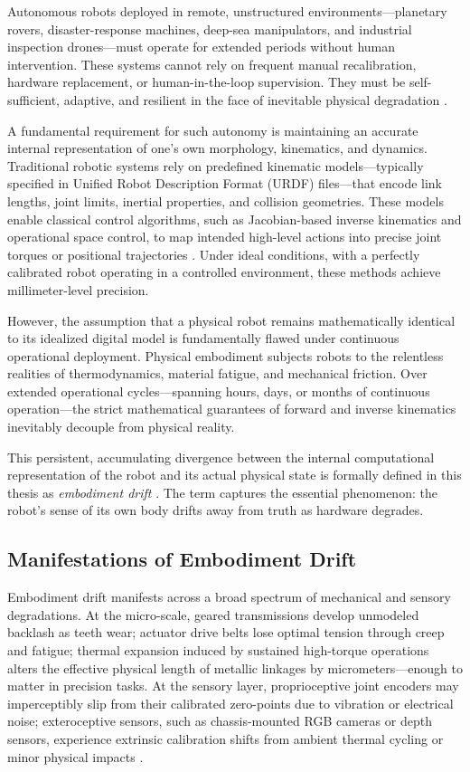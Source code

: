 \documentclass[12pt,a4paper,oneside]{report}
\begin{document}
Autonomous robots deployed in remote, unstructured environments---planetary rovers, disaster-response machines, deep-sea manipulators, and industrial inspection drones---must operate for extended periods without human intervention. These systems cannot rely on frequent manual recalibration, hardware replacement, or human-in-the-loop supervision. They must be self-sufficient, adaptive, and resilient in the face of inevitable physical degradation \cite{bongard2006resilient, cully2015robots}.

A fundamental requirement for such autonomy is maintaining an accurate internal representation of one's own morphology, kinematics, and dynamics. Traditional robotic systems rely on predefined kinematic models---typically specified in Unified Robot Description Format (URDF) files---that encode link lengths, joint limits, inertial properties, and collision geometries. These models enable classical control algorithms, such as Jacobian-based inverse kinematics and operational space control, to map intended high-level actions into precise joint torques or positional trajectories \cite{siciliano2009robotics}. Under ideal conditions, with a perfectly calibrated robot operating in a controlled environment, these methods achieve millimeter-level precision.

However, the assumption that a physical robot remains mathematically identical to its idealized digital model is fundamentally flawed under continuous operational deployment. Physical embodiment subjects robots to the relentless realities of thermodynamics, material fatigue, and mechanical friction. Over extended operational cycles---spanning hours, days, or months of continuous operation---the strict mathematical guarantees of forward and inverse kinematics inevitably decouple from physical reality.

This persistent, accumulating divergence between the internal computational representation of the robot and its actual physical state is formally defined in this thesis as \textit{embodiment drift} \cite{bongard2006resilient, kwiatkowski2019task}. The term captures the essential phenomenon: the robot's sense of its own body drifts away from truth as hardware degrades.

\subsection{Manifestations of Embodiment Drift}
\label{subsec:manifestations_embodiment_drift}

Embodiment drift manifests across a broad spectrum of mechanical and sensory degradations. At the micro-scale, geared transmissions develop unmodeled backlash as teeth wear; actuator drive belts lose optimal tension through creep and fatigue; thermal expansion induced by sustained high-torque operations alters the effective physical length of metallic linkages by micrometers---enough to matter in precision tasks. At the sensory layer, proprioceptive joint encoders may imperceptibly slip from their calibrated zero-points due to vibration or electrical noise; exteroceptive sensors, such as chassis-mounted RGB cameras or depth sensors, experience extrinsic calibration shifts from ambient thermal cycling or minor physical impacts \cite{rezvani2024robust}.
\end{document}
